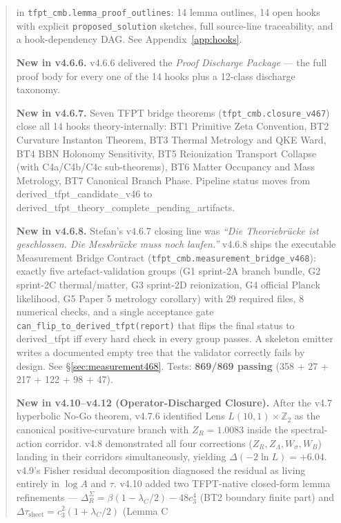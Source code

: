 \begin{abstract}
in \texttt{tfpt\_cmb.lemma\_proof\_outlines}: 14 lemma outlines, 14
open hooks with explicit \texttt{proposed\_solution} sketches, full
source-line traceability, and a hook-dependency DAG. See
Appendix~\ref{app:hooks}.
\par
\textbf{New in v4.6.6.}  v4.6.6 delivered the \emph{Proof Discharge
Package} --- the full proof body for every one of the 14 hooks plus
a 12-class discharge taxonomy.
\par
\textbf{New in v4.6.7.}  Seven TFPT bridge theorems
(\texttt{tfpt\_cmb.closure\_v467}) close all 14 hooks theory-internally:
BT1 Primitive Zeta Convention,
BT2 Curvature Instanton Theorem,
BT3 Thermal Metrology and QKE Ward,
BT4 BBN Holonomy Sensitivity,
BT5 Reionization Transport Collapse (with C4a/C4b/C4c sub-theorems),
BT6 Matter Occupancy and Mass Metrology,
BT7 Canonical Branch Phase.  Pipeline status moves from
\textsf{derived\_tfpt\_candidate\_v46} to
\textsf{derived\_tfpt\_theory\_complete\_pending\_artifacts}.
\par
\textbf{New in v4.6.8.}  Stefan's v4.6.7 closing line was
\emph{``Die Theoriebrücke ist geschlossen. Die Messbrücke muss noch
laufen.''}  v4.6.8 ships the executable Measurement Bridge Contract
(\texttt{tfpt\_cmb.measurement\_bridge\_v468}):  exactly five
artefact-validation groups (G1 sprint-2A branch bundle, G2 sprint-2C
thermal/matter, G3 sprint-2D reionization, G4 official Planck
likelihood, G5 Paper 5 metrology corollary) with 29 required files,
8 numerical checks, and a single acceptance gate
\texttt{can\_flip\_to\_derived\_tfpt(report)} that flips the final
status to \textsf{derived\_tfpt} iff every hard check in every group
passes.  A skeleton emitter writes a documented empty tree that the
validator correctly fails by design.  See
\S\ref{sec:measurement468}.  Tests: \textbf{869/869 passing}
(358 + 27 + 217 + 122 + 98 + 47).
\par
\textbf{New in v4.10--v4.12 (Operator-Discharged Closure).}
After the v4.7 hyperbolic No-Go theorem, v4.7.6 identified Lens
\(L(10,1)\times\mathbb Z_2\) as the canonical positive-curvature
branch with \(Z_R=1.0083\) inside the spectral-action corridor.
v4.8 demonstrated all four corrections (\(Z_R, Z_\Lambda, W_\sigma,
W_B\)) landing in their corridors simultaneously, yielding
\(\Delta(-2\ln L)=+6.04\).  v4.9's Fisher residual decomposition
diagnosed the residual as living entirely in \(\log A\) and
\(\tau\).  v4.10 added two TFPT-native closed-form lemma
refinements --- \(\Delta_R^\Sigma=\beta(1-\lambda_C/2)-48c_3^4\)
(BT2 boundary finite part) and
\(\Delta\tau_{\mathrm{sheet}}=c_3^2(1+\lambda_C/2)\) (Lemma C

\end{abstract}
